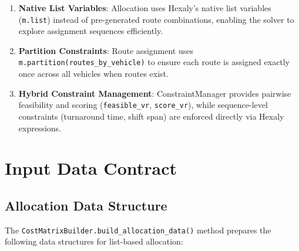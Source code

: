 \documentclass[11pt,a4paper]{article}
\begin{document}
\begin{enumerate}
    \item \textbf{Native List Variables}: Allocation uses Hexaly's native list variables (\texttt{m.list}) instead of pre-generated route combinations, enabling the solver to explore assignment sequences efficiently.
    
    \item \textbf{Partition Constraints}: Route assignment uses \texttt{m.partition(routes\_by\_vehicle)} to ensure each route is assigned exactly once across all vehicles when routes exist.
    
    \item \textbf{Hybrid Constraint Management}: ConstraintManager provides pairwise feasibility and scoring (\texttt{feasible\_vr}, \texttt{score\_vr}), while sequence-level constraints (turnaround time, shift span) are enforced directly via Hexaly expressions.
\end{enumerate}

\section{Input Data Contract}

\subsection{Allocation Data Structure}

The \texttt{CostMatrixBuilder.build\_allocation\_data()} method prepares the following data structures for list-based allocation:
\end{document}
